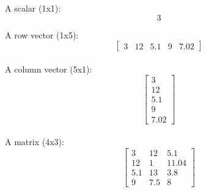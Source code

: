 \documentclass[12pt,a4paper]{article}
\begin{document}

A scalar (1x1):
\[3\]

A row vector (1x5):
\[ \left[ \begin{array}{ccccc}
3 & 12 & 5.1 & 9 & 7.02 \end{array} \right]\]\\

A column vector (5x1):
\[ \left[ \begin{array}{c}
3 \\
12 \\
5.1 \\
9 \\
7.02 \end{array} \right]\]\\

A matrix (4x3):
\[ \left[ \begin{array}{ccc}
3 & 12 & 5.1\\
12 & 1 & 11.04\\
5.1 & 13 & 3.8\\
9 & 7.5 & 8 \end{array} \right]\]\\
\end{document}

